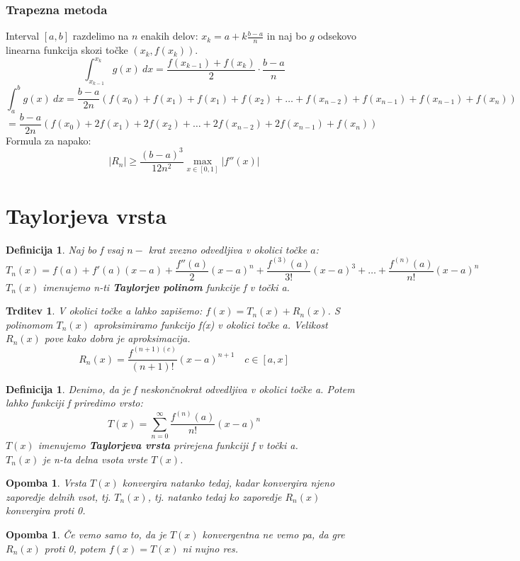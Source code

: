 \documentclass[11pt]{article}
\newtheorem{Trditev}[Izrek]{{\sc Trditev}}
\newtheorem{Definicija}[Izrek]{{\sc Definicija}}
\newtheorem{Opomba}[Izrek]{{\sc Opomba}}
\begin{document}
\subsubsection{Trapezna metoda}
Interval $[a,b]$ razdelimo na $n$ enakih delov: $x_k = a + k \frac{b-a}{n}$ in naj bo
$g$ odsekovo linearna funkcija skozi točke $(x_k, f(x_k))$. 
$$\int_{x_{k-1}}^{x_k}{g(x) \ dx} = \frac{f(x_{k-1}) + f(x_k)}{2} \cdot \frac{b-a}{n}$$
$$\int_{a}^{b}{g(x) \ dx} = \frac{b-a}{2n} (f(x_0) + f(x_1) +f(x_1)+ f(x_2) + \dots + f(x_{n-2}) + f(x_{n-1})+f(x_{n-1}) + f(x_n)) $$
$$= \frac{b-a}{2n}(f(x_0) + 2f(x_1)+ 2f(x_2)+ \dots + 2f(x_{n-2}) + 2f(x_{n-1}) + f(x_n))$$
Formula za napako:
$$|R_n| \ge \frac{(b-a)^3}{12 n^2} \max_{x\in [0,1]}|f''(x)|$$
\section{Taylorjeva vrsta}
\begin{Definicija}
	Naj bo f vsaj $n-$ krat zvezno odvedljiva v okolici točke $a$:
	$$T_n(x) = f(a) + f'(a) (x-a) + \frac{f''(a)}{2}(x-a)^n + \frac{f^{(3)}(a)}{3!}(x-a)^3 + \dots + \frac{f^{(n)}(a)}{n!}(x-a)^n$$
	$T_n(x)$ imenujemo n-ti \textbf{Taylorjev polinom} funkcije f v točki a.
\end{Definicija}
\begin{Trditev}
	V okolici točke a lahko zapišemo: 
	$f(x) = T_n(x) + R_n(x)$. S polinomom $T_n(x)$ aproksimiramo funkcijo f(x) v okolici točke a. Velikost $R_n(x)$ pove kako dobra je aproksimacija.
	$$R_n(x) = \frac{f^{(n+1)(c)}}{(n+1)!} (x-a)^{n+1} \quad c\in[a,x]$$
\end{Trditev}
\begin{Definicija}
	Denimo, da je f neskončnokrat odvedljiva v okolici točke a. Potem lahko funkciji f priredimo vrsto:
	$$T(x) = \sum_{n = 0}^{\infty}{\frac{f^{(n)}(a)}{n!}(x-a)^n}$$
	$T(x)$ imenujemo \textbf{Taylorjeva vrsta} prirejena funkciji f v točki a.
	\\
	$T_n(x)$ je n-ta delna vsota vrste $T(x)$.
\end{Definicija}
\begin{Opomba}
	Vrsta $T(x)$ konvergira natanko tedaj, kadar konvergira njeno zaporedje delnih vsot, tj. $T_n(x)$, tj. natanko tedaj ko zaporedje $R_n(x)$ konvergira proti 0.
\end{Opomba}
\begin{Opomba}
	Če vemo samo to, da je $T(x)$ konvergentna ne vemo pa, da gre $R_n(x)$ proti 0, potem $f(x) = T(x) $ ni nujno res.
\end{Opomba}
\end{document}
